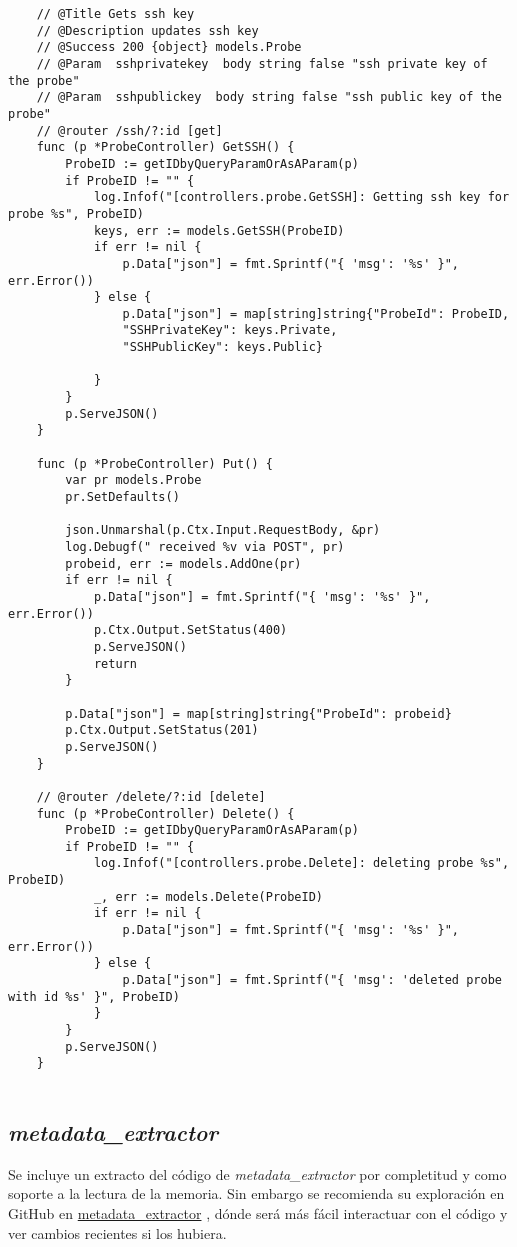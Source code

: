 \begin{verbatim}
    // @Title Gets ssh key
    // @Description updates ssh key
    // @Success 200 {object} models.Probe
    // @Param  sshprivatekey  body string false "ssh private key of the probe"
    // @Param  sshpublickey  body string false "ssh public key of the probe"
    // @router /ssh/?:id [get]
    func (p *ProbeController) GetSSH() {
        ProbeID := getIDbyQueryParamOrAsAParam(p)
        if ProbeID != "" {
            log.Infof("[controllers.probe.GetSSH]: Getting ssh key for probe %s", ProbeID)
            keys, err := models.GetSSH(ProbeID)
            if err != nil {
                p.Data["json"] = fmt.Sprintf("{ 'msg': '%s' }", err.Error())
            } else {
                p.Data["json"] = map[string]string{"ProbeId": ProbeID, 
                "SSHPrivateKey": keys.Private, 
                "SSHPublicKey": keys.Public}
    
            }
        }
        p.ServeJSON()
    }
    
    func (p *ProbeController) Put() {
        var pr models.Probe
        pr.SetDefaults()
    
        json.Unmarshal(p.Ctx.Input.RequestBody, &pr)
        log.Debugf(" received %v via POST", pr)
        probeid, err := models.AddOne(pr)
        if err != nil {
            p.Data["json"] = fmt.Sprintf("{ 'msg': '%s' }", err.Error())
            p.Ctx.Output.SetStatus(400)
            p.ServeJSON()
            return
        }
    
        p.Data["json"] = map[string]string{"ProbeId": probeid}
        p.Ctx.Output.SetStatus(201)
        p.ServeJSON()
    }
    
    // @router /delete/?:id [delete]
    func (p *ProbeController) Delete() {
        ProbeID := getIDbyQueryParamOrAsAParam(p)
        if ProbeID != "" {
            log.Infof("[controllers.probe.Delete]: deleting probe %s", ProbeID)
            _, err := models.Delete(ProbeID)
            if err != nil {
                p.Data["json"] = fmt.Sprintf("{ 'msg': '%s' }", err.Error())
            } else {
                p.Data["json"] = fmt.Sprintf("{ 'msg': 'deleted probe with id %s' }", ProbeID)
            }
        }
        p.ServeJSON()
    }
    
\end{verbatim}

\subsection{\emph{metadata\_extractor}}
\label{subsec:metadata-extractor-src-code}
Se incluye un extracto del código de \emph{metadata\_extractor} por completitud y como soporte a la lectura de la memoria. Sin
embargo se recomienda su exploración en GitHub en \href{https://github.com/metadata\_extractor}{metadata\_extractor} , dónde será más fácil interactuar con el código y ver cambios recientes si los 
hubiera.

